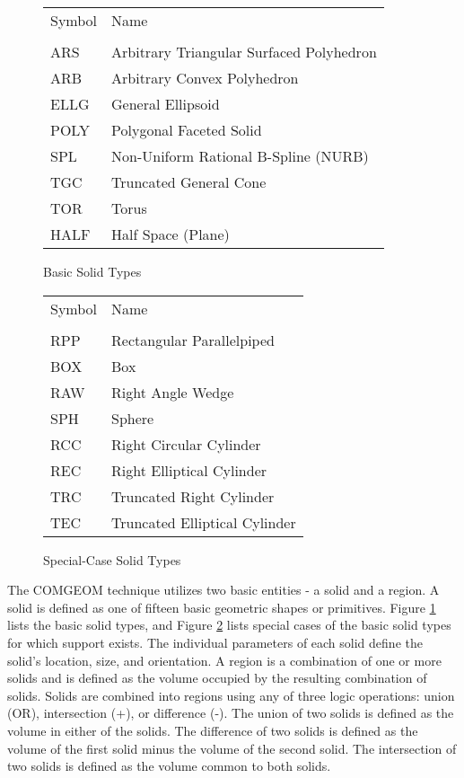 \begin{figure}[tb]
\begin{tabular}{l l}
Symbol & Name \\
\\
ARS	& Arbitrary Triangular Surfaced Polyhedron \\
ARB	& Arbitrary Convex Polyhedron \\
ELLG	& General Ellipsoid \\
POLY	& Polygonal Faceted Solid \\
SPL	& Non-Uniform Rational B-Spline (NURB) \\
TGC	& Truncated General Cone \\
TOR	& Torus \\
HALF	& Half Space (Plane)
\end{tabular}
\caption{Basic Solid Types \label{list-of-basic-solids} }
\end{figure}
\begin{figure}[tb]
\begin{tabular}{l l}
Symbol & Name \\
\\
RPP	& Rectangular Parallelpiped \\
BOX	& Box \\
RAW	& Right Angle Wedge \\
SPH	& Sphere \\
RCC	& Right Circular Cylinder \\
REC	& Right Elliptical Cylinder \\
TRC	& Truncated Right Cylinder \\
TEC	& Truncated Elliptical Cylinder \\
\end{tabular}
\caption{Special-Case Solid Types \label{list-of-special-case-solids} }
\end{figure}
The COMGEOM technique utilizes two basic entities - a solid and a region.
A solid is defined as one of fifteen basic geometric shapes or
primitives.  Figure \ref{list-of-basic-solids} lists the
basic solid types, and Figure \ref{list-of-special-case-solids}
lists special cases of the basic solid types for which support exists.
The individual parameters of each solid define the solid's
location, size, and orientation.  A region is a combination of
one or more solids and is defined as the volume occupied
by the resulting combination of solids.
Solids are combined into regions using any of three logic
operations: union (OR), intersection (+), or difference (-).
The union of two solids is defined as the volume in either
of the solids.
The difference of two solids is defined as the volume of the first
solid minus the volume of the second solid.
The intersection of two solids is defined as the volume
common to both solids.

